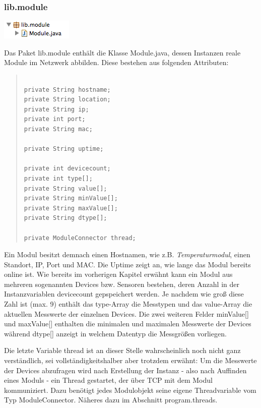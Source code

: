 \documentclass[a4paper,14pt,headsepline]{scrartcl}
\begin{document}
\newpage

\subsubsection*{lib.module}

\includegraphics[width=0.17 \paperwidth]{./bilder/lib_module.png}

Das Paket lib.module enthält die Klasse Module.java, dessen Instanzen reale Module im Netzwerk abbilden. Diese bestehen aus folgenden Attributen:

\begin{quote}
\begin{verbatim}

private String hostname;
private String location;
private String ip;
private int port;
private String mac;

private String uptime;

private int devicecount;		
private int type[];				
private String value[];			
private String minValue[];	
private String maxValue[];		
private String dtype[];			
	
private ModuleConnector thread;	

\end{verbatim}
\end{quote}

\newpage

Ein Modul besitzt demnach einen Hostnamen, wie z.B. \textit{Temperaturmodul}, einen Standort, IP, Port und MAC. Die Uptime zeigt an, wie lange das Modul bereits online ist. Wie bereits im vorherigen Kapitel erwähnt kann ein Modul aus mehreren sogenannten Devices bzw. Sensoren bestehen, deren Anzahl in der Instanzvariablen devicecount gepspeichert werden. Je nachdem wie groß diese Zahl ist (max. 9) enthält das type-Array die Messtypen und das value-Array die aktuellen Messwerte der einzelnen Devices. Die zwei weiteren Felder minValue[] und maxValue[] enthalten die minimalen und maximalen Messwerte der Devices während dtype[] anzeigt in welchem Datentyp die Messgrößen vorliegen. 

Die letzte Variable thread ist an dieser Stelle wahrscheinlich noch nicht ganz verständlich, sei vollständigkeitshalber aber trotzdem erwähnt: Um die Messwerte der Devices abzufragen wird nach Erstellung der Instanz - also nach Auffinden eines Moduls - ein Thread gestartet, der über TCP mit dem Modul kommuniziert. Dazu benötigt jedes Modulobjekt seine eigene Threadvariable vom Typ ModuleConnector. Näheres dazu im Abschnitt program.threads. 
\end{document}
